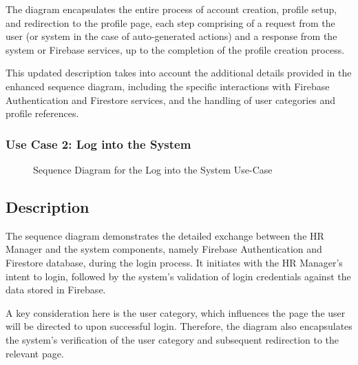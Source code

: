 The diagram encapsulates the entire process of account creation, profile setup, and redirection to the profile page, each step comprising of a request from the user (or system in the case of auto-generated actions) and a response from the system or Firebase services, up to the completion of the profile creation process.

This updated description takes into account the additional details provided in the enhanced sequence diagram, including the specific interactions with Firebase Authentication and Firestore services, and the handling of user categories and profile references.


\subsubsection{Use Case 2: Log into the System} 


\begin{figure}[H]
    \centering
    \caption{ Sequence Diagram for the Log into the System Use-Case }
    \label{fig:UseCase2_Sequence_Diagram}
\end{figure}

\subsection*{Description}
The sequence diagram demonstrates the detailed exchange between the HR Manager and the system components, namely Firebase Authentication and Firestore database, during the login process. It initiates with the HR Manager's intent to login, followed by the system's validation of login credentials against the data stored in Firebase.

A key consideration here is the user category, which influences the page the user will be directed to upon successful login. Therefore, the diagram also encapsulates the system's verification of the user category and subsequent redirection to the relevant page.

